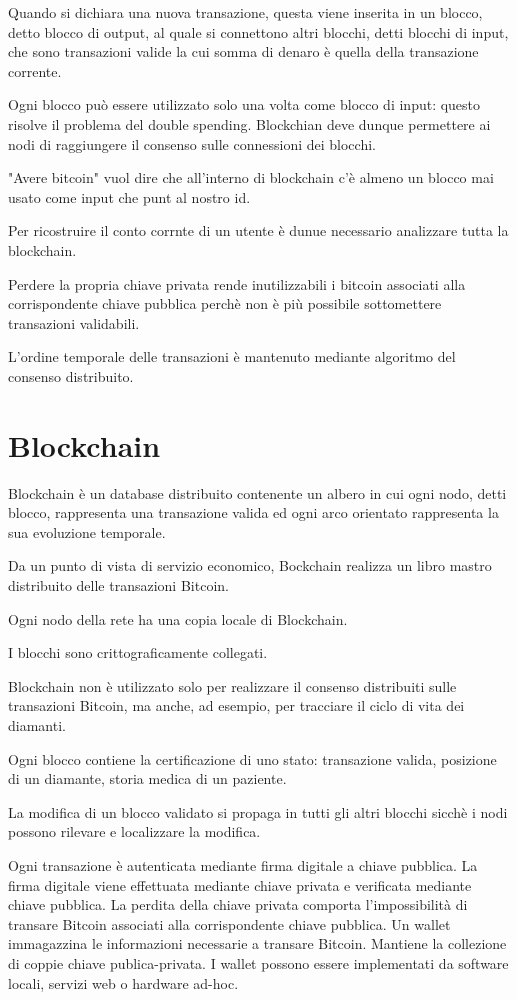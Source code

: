 Quando si dichiara una nuova transazione, questa viene inserita in un blocco, detto blocco di output, al quale si connettono altri blocchi, detti blocchi di input, che sono transazioni valide la cui somma di denaro è quella della transazione corrente.

Ogni blocco può essere utilizzato solo una volta come blocco di input: questo risolve il problema del double spending.
Blockchian deve dunque permettere ai nodi di raggiungere il consenso sulle connessioni dei blocchi.

"Avere bitcoin" vuol dire che all'interno di blockchain c'è almeno un blocco mai usato come input che punt al nostro id.

Per ricostruire il conto corrnte di un utente è dunue necessario analizzare tutta la blockchain.

Perdere la propria chiave privata rende inutilizzabili i bitcoin associati alla corrispondente chiave pubblica perchè non è più possibile sottomettere transazioni validabili.

L'ordine temporale delle transazioni è mantenuto mediante algoritmo del consenso distribuito.


\section{Blockchain}
Blockchain è un database distribuito contenente un albero in cui ogni nodo, detti blocco, rappresenta una transazione valida ed ogni arco orientato rappresenta la sua evoluzione temporale.

Da un punto di vista di servizio economico, Bockchain realizza un libro mastro distribuito delle transazioni Bitcoin.

Ogni nodo della rete ha una copia locale di Blockchain.

I blocchi sono crittograficamente collegati.

Blockchain non è utilizzato solo per realizzare il consenso distribuiti sulle transazioni Bitcoin, ma anche, ad esempio, per tracciare il ciclo di vita dei diamanti.

Ogni blocco contiene la certificazione di uno stato: transazione valida, posizione di un diamante, storia medica di un paziente.

La modifica di un blocco validato si propaga in tutti gli altri blocchi sicchè i nodi possono rilevare e localizzare la modifica.

Ogni transazione è autenticata mediante firma digitale a chiave pubblica. La firma digitale viene effettuata mediante chiave privata e verificata mediante chiave pubblica. La perdita della chiave privata comporta l'impossibilità di transare Bitcoin associati alla corrispondente chiave pubblica.
Un wallet immagazzina le informazioni necessarie a transare Bitcoin. Mantiene la collezione di coppie chiave publica-privata. I wallet possono essere implementati da software locali, servizi web o hardware ad-hoc.

